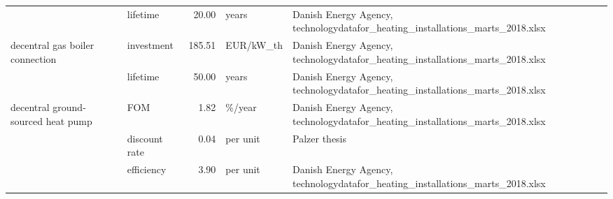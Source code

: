 \begin{longtable}{p{5cm}p{3cm}rp{3cm}p{11cm}}
                      & lifetime &          20.00 &                             years &                                                                                                                                                                                                                                                        Danish Energy Agency, technologydatafor\_heating\_installations\_marts\_2018.xlsx \\
decentral gas boiler connection & investment &         185.51 &                         EUR/kW\_th &                                                                                                                                                                                                                                                        Danish Energy Agency, technologydatafor\_heating\_installations\_marts\_2018.xlsx \\
                      & lifetime &          50.00 &                             years &                                                                                                                                                                                                                                                        Danish Energy Agency, technologydatafor\_heating\_installations\_marts\_2018.xlsx \\
decentral ground-sourced heat pump & FOM &           1.82 &                            \%/year &                                                                                                                                                                                                                                                        Danish Energy Agency, technologydatafor\_heating\_installations\_marts\_2018.xlsx \\
                      & discount rate &           0.04 &                          per unit &                                                                                                                                                                                                                                                                                                                        Palzer thesis \\
                      & efficiency &           3.90 &                          per unit &                                                                                                                                                                                                                                                        Danish Energy Agency, technologydatafor\_heating\_installations\_marts\_2018.xlsx \\

\end{longtable}

